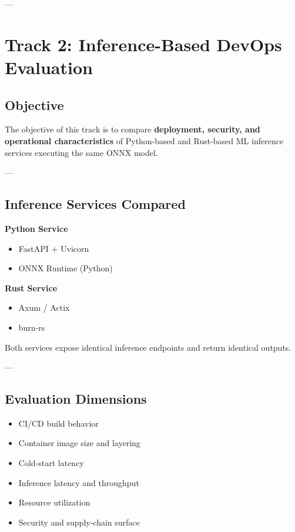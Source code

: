 \documentclass[11pt,a4paper]{article}
\begin{document}
---

\section{Track 2: Inference-Based DevOps Evaluation}

\subsection{Objective}

The objective of this track is to compare \textbf{deployment, security, and operational characteristics} of Python-based and Rust-based ML inference services executing the same ONNX model.

---

\subsection{Inference Services Compared}

\textbf{Python Service}
\begin{itemize}
    \item FastAPI + Uvicorn
    \item ONNX Runtime (Python)
\end{itemize}

\textbf{Rust Service}
\begin{itemize}
    \item Axum / Actix
    \item burn-rs
\end{itemize}

Both services expose identical inference endpoints and return identical outputs.

---

\subsection{Evaluation Dimensions}

\begin{itemize}
    \item CI/CD build behavior
    \item Container image size and layering
    \item Cold-start latency
    \item Inference latency and throughput
    \item Resource utilization
    \item Security and supply-chain surface
\end{itemize}
\end{document}
